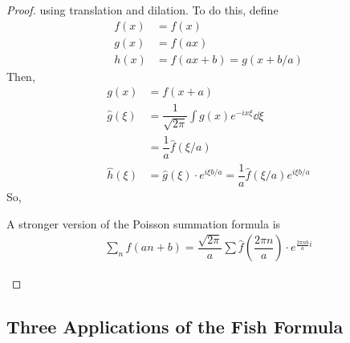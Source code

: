 \begin{proof}
    using translation and dilation. To do this, define
    \begin{align}
        f(x) &= f(x)\\
        g(x) &= f(ax)\\
        h(x) &= f(ax+b) = g(x+b/a)
    \end{align}
    Then,
    \begin{align}
        g(x) &= f(x+a)\\
        \hat{g}(\xi) &= \dfrac{1}{\sqrt{2\pi}} \int g(x) e^{-ix\xi} \dd{\xi}\\
        &= \dfrac{1}{a}\hat{f}(\xi/a)\\
        \hat{h}(\xi) &= \hat{g}(\xi) \cdot e^{i\xi b/a} = \boxed{
        \dfrac{1}{a}\hat{f}(\xi/a)e^{i\xi b/a}
        }
    \end{align}
    So,
    \begin{lemma}
        A stronger version of the Poisson summation formula is
        \begin{align}
            \sum_n f(an+b) = \dfrac{\sqrt{2\pi}}{a} \sum \hat{f}\left( \dfrac{2\pi n}{a} \right) \cdot e^{\frac{2\pi n b}{a}i}
        \end{align}
    \end{lemma}
\end{proof}

\subsection{Three Applications of the Fish Formula}
